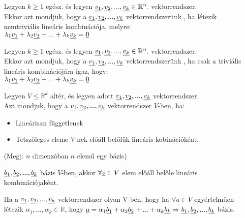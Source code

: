 	\begin{frame}
	\begin{tcolorbox}[title={Def.: Lineáris összefüggőség}]
			Legyen $k \geq 1$ egész. és legyen $\underline{v_1}, \underline{v_2}, ..., \underline{v_k} \in \mathbb{R}^n$. vektorrendszer.\\
			Ekkor azt mondjuk, hogy a $\underline{v_1}, \underline{v_2}, ..., \underline{v_k}$ vektorrendszerünk , ha létezik nemtriviális lineáris kombinációja, melyre:\\
			${\lambda}_1\underline{v_1} + {\lambda}_2\underline{v_2} + ... + {\lambda}_k\underline{v_k} = \underline{0}$
		\end{tcolorbox}
		
		\begin{tcolorbox}[title={Def.: Lineáris függetlenség}]
			Legyen $k \geq 1$ egész. és legyen $\underline{v_1}, \underline{v_2}, ..., \underline{v_k} \in \mathbb{R}^n$. vektorrendszer.\\
			Ekkor azt mondjuk, hogy a $\underline{v_1}, \underline{v_2}, ..., \underline{v_k}$ vektorrendszerünk , ha csak a triviális lineáris kombinációjára igaz, hogy:\\
			${\lambda}_1\underline{v_1} + {\lambda}_2\underline{v_2} + ... + {\lambda}_k\underline{v_k} = \underline{0}$
		\end{tcolorbox}
		
		\begin{tcolorbox}[title={Def.: Bázis}]
			Legyen $ V \leq \mathbb{R}^k$ altér, és legyen adott $\underline{v_1}, \underline{v_2}, ..., \underline{v_k}$ vektorrendszer.\\
			Azt mondjuk, hogy a $\underline{v_1}, \underline{v_2}, ..., \underline{v_k}$ vektorrendszer  $V$-ben, ha:\\
			\begin{itemize}
				\item Lineárisan függetlenek
				\item Tetszőleges eleme $V$-nek előáll belőlük lineáris kobinációként.
			\end{itemize}
			\mmedskip
			
			 (Megj:   $n$ dimenzóban $n$ elemű egy bázis)
		\end{tcolorbox}
		
		\begin{tcolorbox}[title={Tétel: Lineáris kombináció, és bázisok}]
			$\underline{b_1}, \underline{b_2}, ..., \underline{b_k}$ bázis $V$-ben, akkor $\forall \underline{v} \in V$ elem  előáll belőle lineáris kombinációjaként.
		\end{tcolorbox}
		
		\begin{tcolorbox}[title={Tétel: Bázisok, és Lineáris kombináció}]
			Ha a $\underline{v_1}, \underline{v_2}, ..., \underline{v_k}$ vektorrendszer olyan V-ben, hogy ha $\forall a \in V$ egyértelműen létezik ${\alpha}_1, ..., {\alpha}_k \in \mathbb{R}$, hogy $\underline{a} = {\alpha}_1\underline{b_1} + {\alpha}_2\underline{b_2} + ... + {\alpha}_k\underline{b_k} \Rightarrow \underline{b_1}, \underline{b_2}, ..., \underline{b_k}$ bázis.
		\end{tcolorbox}
		
	\end{frame}
	
